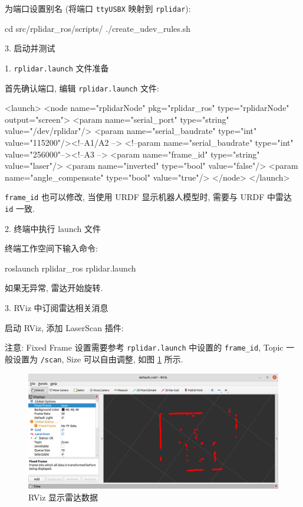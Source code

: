 \documentclass[openany, fontset=windowsold]{ctexbook}
\theoremstyle{kaiti}
\theoremstyle{normal}
\begin{document}
为端口设置别名 (将端口 \verb|ttyUSBX| 映射到 \verb|rplidar|):

\begin{bash}
  cd src/rplidar_ros/scripts/
  ./create_udev_rules.sh
\end{bash}

3. 启动并测试

1. \verb|rplidar.launch| 文件准备

首先确认端口, 编辑 \verb|rplidar.launch| 文件:

\begin{xml}
  <launch>
    <node name="rplidarNode"          pkg="rplidar_ros"  type="rplidarNode" output="screen">
    <param name="serial_port"         type="string" value="/dev/rplidar"/>
    <param name="serial_baudrate"     type="int"    value="115200"/><!--A1/A2 -->
    <!--param name="serial_baudrate"     type="int"    value="256000"--><!--A3 -->
    <param name="frame_id"            type="string" value="laser"/>
    <param name="inverted"            type="bool"   value="false"/>
    <param name="angle_compensate"    type="bool"   value="true"/>
    </node>
  </launch>
\end{xml}

\verb|frame_id| 也可以修改, 当使用 URDF 显示机器人模型时, 需要与 URDF 中雷达 \verb|id| 一致.

2. 终端中执行 launch 文件

终端工作空间下输入命令:

\begin{bash}
  roslaunch rplidar_ros rplidar.launch
\end{bash}

如果无异常, 雷达开始旋转.

3. RViz 中订阅雷达相关消息

启动 RViz, 添加 LaserScan 插件: 

注意: Fixed Frame 设置需要参考 \verb|rplidar.launch| 中设置的 \verb|frame_id|, Topic 一般设置为 \verb|/scan|, Size 可以自由调整, 如图 \ref{fig:rviz_show_lidar_A1} 所示.

\begin{figure}[!ht]
  \centering
  \includegraphics[width=.8\textwidth]{rviz_show_lidar_A1.png}
  \caption{RViz 显示雷达数据}
  \label{fig:rviz_show_lidar_A1}
\end{figure}
\end{document}
